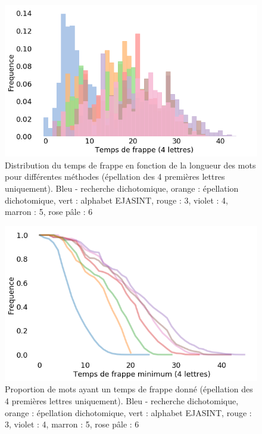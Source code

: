 \documentclass[twoside,twocolumn]{article}
\begin{document}
\begin{center}
\begin{figure}
  \includegraphics[scale=0.35]{distrib4.png}
  \caption{Distribution du temps de frappe en fonction de la longueur des mots pour différentes méthodes (épellation des 4 premières lettres uniquement). Bleu - recherche dichotomique, orange : épellation dichotomique, vert : alphabet EJASINT, rouge : 3, violet : 4, marron : 5, rose pâle : 6}
  \label{distrib4}
\end{figure}
\end{center}

\begin{center}
\begin{figure}
  \includegraphics[scale=0.35]{frappe-mini4.png}
  \caption{Proportion de mots ayant un temps de frappe donné (épellation des 4 premières lettres uniquement). Bleu - recherche dichotomique, orange : épellation dichotomique, vert : alphabet EJASINT, rouge : 3, violet : 4, marron : 5, rose pâle : 6}
  \label{frappe-mini4}
\end{figure}
\end{center}
\end{document}
